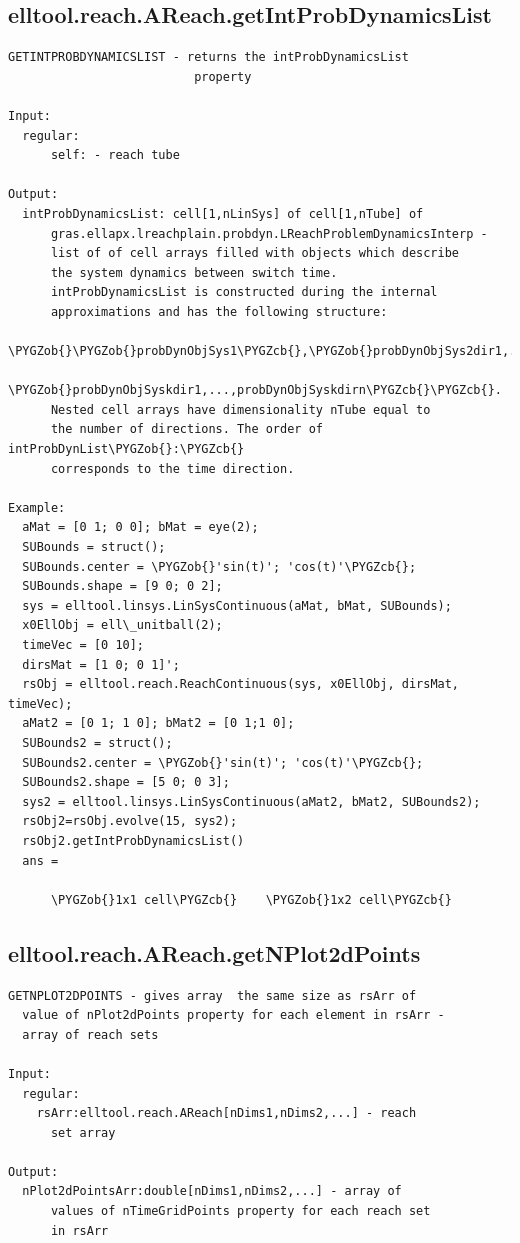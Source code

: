 \documentclass[letterpaper,10pt,english]{sphinxmanual}
\def\PYGZob{\char`\{}
\def\PYGZcb{\char`\}}
\begin{document}
\subsection{elltool.reach.AReach.getIntProbDynamicsList}
\label{chap_functions:elltool-reach-areach-getintprobdynamicslist}
\begin{Verbatim}[commandchars=\\\{\}]
GETINTPROBDYNAMICSLIST - returns the intProbDynamicsList
                          property

Input:
  regular:
      self: - reach tube

Output:
  intProbDynamicsList: cell[1,nLinSys] of cell[1,nTube] of
      gras.ellapx.lreachplain.probdyn.LReachProblemDynamicsInterp -
      list of of cell arrays filled with objects which describe
      the system dynamics between switch time.
      intProbDynamicsList is constructed during the internal
      approximations and has the following structure:
      \PYGZob{}\PYGZob{}probDynObjSys1\PYGZcb{},\PYGZob{}probDynObjSys2dir1,...,probDynObjSys2dirn\PYGZcb{},...,
      \PYGZob{}probDynObjSyskdir1,...,probDynObjSyskdirn\PYGZcb{}\PYGZcb{}.
      Nested cell arrays have dimensionality nTube equal to
      the number of directions. The order of intProbDynList\PYGZob{}:\PYGZcb{}
      corresponds to the time direction.

Example:
  aMat = [0 1; 0 0]; bMat = eye(2);
  SUBounds = struct();
  SUBounds.center = \PYGZob{}'sin(t)'; 'cos(t)'\PYGZcb{};
  SUBounds.shape = [9 0; 0 2];
  sys = elltool.linsys.LinSysContinuous(aMat, bMat, SUBounds);
  x0EllObj = ell\_unitball(2);
  timeVec = [0 10];
  dirsMat = [1 0; 0 1]';
  rsObj = elltool.reach.ReachContinuous(sys, x0EllObj, dirsMat, timeVec);
  aMat2 = [0 1; 1 0]; bMat2 = [0 1;1 0];
  SUBounds2 = struct();
  SUBounds2.center = \PYGZob{}'sin(t)'; 'cos(t)'\PYGZcb{};
  SUBounds2.shape = [5 0; 0 3];
  sys2 = elltool.linsys.LinSysContinuous(aMat2, bMat2, SUBounds2);
  rsObj2=rsObj.evolve(15, sys2);
  rsObj2.getIntProbDynamicsList()
  ans =

      \PYGZob{}1x1 cell\PYGZcb{}    \PYGZob{}1x2 cell\PYGZcb{}
\end{Verbatim}


\subsection{elltool.reach.AReach.getNPlot2dPoints}
\label{chap_functions:elltool-reach-areach-getnplot2dpoints}
\begin{Verbatim}[commandchars=\\\{\}]
GETNPLOT2DPOINTS - gives array  the same size as rsArr of
  value of nPlot2dPoints property for each element in rsArr -
  array of reach sets

Input:
  regular:
    rsArr:elltool.reach.AReach[nDims1,nDims2,...] - reach
      set array

Output:
  nPlot2dPointsArr:double[nDims1,nDims2,...] - array of
      values of nTimeGridPoints property for each reach set
      in rsArr
\end{Verbatim}
\end{document}
